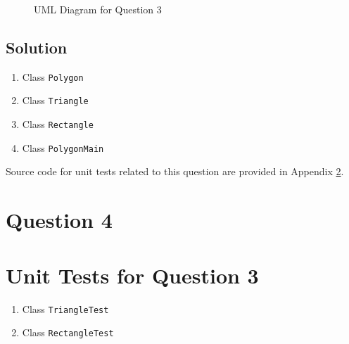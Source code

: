 \begin{figure}
\centering
\caption{UML Diagram for Question 3}\label{fig3}
\end{figure}

\subsection*{Solution}

\begin{enumerate}
	\item Class \texttt{Polygon}
	
	\item Class \texttt{Triangle}
	
	\item Class \texttt{Rectangle}
	
	\item Class \texttt{PolygonMain}
	
\end{enumerate}

Source code for unit tests related to this question are provided in Appendix \ref{App:AppendixA}.

\section{Question 4}

\newpage
\appendix

\section{Unit Tests for Question 3}\label{App:AppendixA}

\begin{enumerate}
	\item Class \texttt{TriangleTest}
	
	\item Class \texttt{RectangleTest}
	
\end{enumerate}

\begin{appendix}
	\listoffigures
	\listoftables
\end{appendix}
